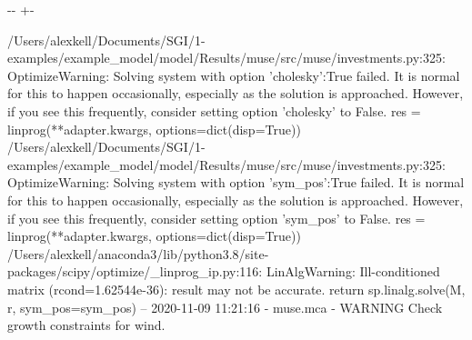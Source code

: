 \documentclass[letterpaper,10pt,english]{sphinxmanual}
\newlength\nbsphinxcodecellspacing
\begin{document}
{

\kern-\sphinxverbatimsmallskipamount\kern-\baselineskip
\kern+\FrameHeightAdjust\kern-\fboxrule
\vspace{\nbsphinxcodecellspacing}

\begin{sphinxVerbatim}[commandchars=\\\{\}]
/Users/alexkell/Documents/SGI/1-examples/example\_model/model/Results/muse/src/muse/investments.py:325: OptimizeWarning: Solving system with option 'cholesky':True failed. It is normal for this to happen occasionally, especially as the solution is approached. However, if you see this frequently, consider setting option 'cholesky' to False.
  res = linprog(**adapter.kwargs, options=dict(disp=True))
/Users/alexkell/Documents/SGI/1-examples/example\_model/model/Results/muse/src/muse/investments.py:325: OptimizeWarning: Solving system with option 'sym\_pos':True failed. It is normal for this to happen occasionally, especially as the solution is approached. However, if you see this frequently, consider setting option 'sym\_pos' to False.
  res = linprog(**adapter.kwargs, options=dict(disp=True))
/Users/alexkell/anaconda3/lib/python3.8/site-packages/scipy/optimize/\_linprog\_ip.py:116: LinAlgWarning: Ill-conditioned matrix (rcond=1.62544e-36): result may not be accurate.
  return sp.linalg.solve(M, r, sym\_pos=sym\_pos)
-- 2020-11-09 11:21:16 - muse.mca - WARNING
Check growth constraints for wind.

\end{sphinxVerbatim}
}
\end{document}
